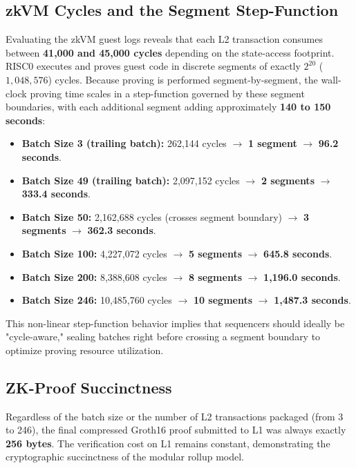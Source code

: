 \subsection{zkVM Cycles and the Segment Step-Function}
Evaluating the zkVM guest logs reveals that each L2 transaction consumes between \textbf{41,000 and 45,000 cycles} depending on the state-access footprint. RISC0 executes and proves guest code in discrete segments of exactly $2^{20}$ ($1,048,576$) cycles. Because proving is performed segment-by-segment, the wall-clock proving time scales in a step-function governed by these segment boundaries, with each additional segment adding approximately \textbf{140 to 150 seconds}:
\begin{itemize}
    \item \textbf{Batch Size 3 (trailing batch):} 262,144 cycles $\rightarrow$ \textbf{1 segment} $\rightarrow$ \textbf{96.2 seconds}.
    \item \textbf{Batch Size 49 (trailing batch):} 2,097,152 cycles $\rightarrow$ \textbf{2 segments} $\rightarrow$ \textbf{333.4 seconds}.
    \item \textbf{Batch Size 50:} 2,162,688 cycles (crosses segment boundary) $\rightarrow$ \textbf{3 segments} $\rightarrow$ \textbf{362.3 seconds}.
    \item \textbf{Batch Size 100:} 4,227,072 cycles $\rightarrow$ \textbf{5 segments} $\rightarrow$ \textbf{645.8 seconds}.
    \item \textbf{Batch Size 200:} 8,388,608 cycles $\rightarrow$ \textbf{8 segments} $\rightarrow$ \textbf{1,196.0 seconds}.
    \item \textbf{Batch Size 246:} 10,485,760 cycles $\rightarrow$ \textbf{10 segments} $\rightarrow$ \textbf{1,487.3 seconds}.
\end{itemize}
This non-linear step-function behavior implies that sequencers should ideally be "cycle-aware," sealing batches right before crossing a segment boundary to optimize proving resource utilization.
\subsection{ZK-Proof Succinctness}
Regardless of the batch size or the number of L2 transactions packaged (from 3 to 246), the final compressed Groth16 proof submitted to L1 was always exactly \textbf{256 bytes}. The verification cost on L1 remains constant, demonstrating the cryptographic succinctness of the modular rollup model.


